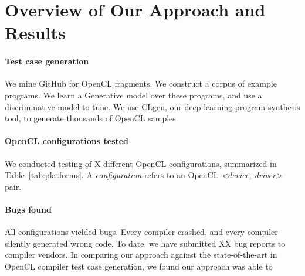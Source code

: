\section{Overview of Our Approach and Results}\label{sec:overview}

\paragraph{Test case generation} We mine GitHub for OpenCL fragments. We construct a corpus of example programs. We learn a Generative model over these programs, and use a discriminative model to tune. We use CLgen, our deep learning program synthesis tool, to generate thousands of OpenCL samples.

\paragraph{OpenCL configurations tested} We conducted testing of X different OpenCL configurations, summarized in Table~\ref{tab:platforms}. A \emph{configuration} refers to an OpenCL \emph{<device, driver>} pair.



\paragraph{Bugs found} All configurations yielded bugs. Every compiler crashed, and every compiler silently generated wrong code. To date, we have submitted XX bug reports to compiler vendors. In comparing our approach against the state-of-the-art in OpenCL compiler test case generation, we found our approach was able to \cc{\ldots}